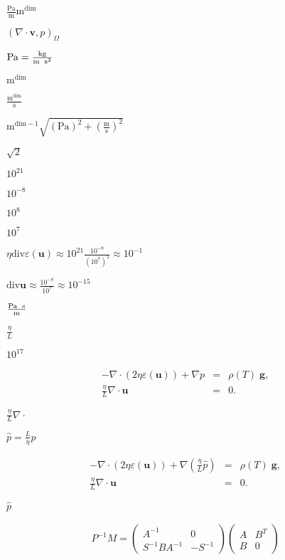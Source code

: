 \documentclass{article}
\begin{document}
$\frac{\text{Pa}}{\text{m}} \text{m}^{\text{dim}}$
\pagebreak

$(\nabla \cdot \mathbf v, p)_{\Omega}$
\pagebreak

$\text{Pa}=\frac{\text{kg}}{\text{m\; s}^2}$
\pagebreak

$\text{m}^{\text{dim}}$
\pagebreak

$\frac{\text{m}^{\text{dim}}}{\text{s}}$
\pagebreak

$\text{m}^{\text{dim}-1} \sqrt{\left(\text{Pa}\right)^2 + \left(\frac{\text{m}}{\text{s}}\right)^2}$
\pagebreak

$\sqrt{2}$
\pagebreak

$10^{21}$
\pagebreak

$10^{-8}$
\pagebreak

$10^8$
\pagebreak

$10^7$
\pagebreak

$\eta\text{div}\varepsilon(\mathbf u) \approx 10^{21} \frac{10^{-8}}{(10^7)^2} \approx 10^{-1}$
\pagebreak

$\text{div}{\mathbf u}\approx \frac{10^{-8}}{10^7} \approx 10^{-15}$
\pagebreak

$\frac{\text{Pa\; s}}{\text{m}}$
\pagebreak

$\frac{\eta}{L}$
\pagebreak

$10^{17}$
\pagebreak

\begin{eqnarray*} -\nabla \cdot (2 \eta \varepsilon ({\mathbf u})) + \nabla p &=& \rho(T) \; \mathbf{g}, \\ \frac{\eta}{L} \nabla \cdot {\mathbf u} &=& 0. \end{eqnarray*}
\pagebreak

$\frac{\eta}{L} \nabla \cdot$
\pagebreak

$\hat p = \frac{L}{\eta}p$
\pagebreak

\begin{eqnarray*} -\nabla \cdot (2 \eta \varepsilon ({\mathbf u})) + \nabla \left(\frac{\eta}{L} \hat p\right) &=& \rho(T) \; \mathbf{g}, \\ \frac{\eta}{L} \nabla \cdot {\mathbf u} &=& 0. \end{eqnarray*}
\pagebreak

$\hat p$
\pagebreak

\begin{eqnarray*} P^{-1} M = \left(\begin{array}{cc} A^{-1} & 0 \\ S^{-1} B A^{-1} & -S^{-1} \end{array}\right) \left(\begin{array}{cc} A & B^T \\ B & 0 \end{array}\right) \end{eqnarray*}
\pagebreak
\end{document}

